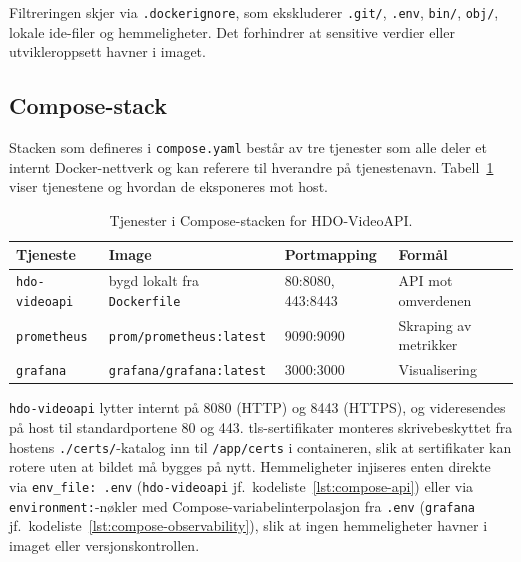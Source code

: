 Filtreringen skjer via \texttt{.dockerignore}, som ekskluderer \texttt{.git/}, \texttt{.env}, \texttt{bin/}, \texttt{obj/}, lokale \gls{ide}-filer og hemmeligheter. Det forhindrer at sensitive verdier eller utvikleroppsett havner i imaget.

\subsection{Compose-stack}
\label{subsec:docker-compose}

Stacken som defineres i \texttt{compose.yaml} består av tre tjenester som alle deler et internt Docker-nettverk og kan referere til hverandre på tjenestenavn. Tabell~\ref{tab:compose-services} viser tjenestene og hvordan de eksponeres mot host.

\begin{table}[H]
\centering
\caption{Tjenester i Compose-stacken for HDO-VideoAPI.}
\label{tab:compose-services}
\begin{tabular}{l l l l}
\toprule
\textbf{Tjeneste} & \textbf{Image} & \textbf{Portmapping} & \textbf{Formål} \\
\midrule
\texttt{hdo-videoapi} & bygd lokalt fra \texttt{Dockerfile} & 80:8080, 443:8443 & API mot omverdenen \\
\texttt{prometheus}   & \texttt{prom/prometheus:latest}     & 9090:9090         & Skraping av metrikker \\
\texttt{grafana}      & \texttt{grafana/grafana:latest}     & 3000:3000         & Visualisering \\
\bottomrule
\end{tabular}
\end{table}


\texttt{hdo-videoapi} lytter internt på 8080 (HTTP) og 8443 (HTTPS), og videresendes på host til standardportene 80 og 443. \gls{tls}-sertifikater monteres skrivebeskyttet fra hostens \texttt{./certs/}-katalog inn til \texttt{/app/certs} i containeren, slik at sertifikater kan rotere uten at bildet må bygges på nytt. Hemmeligheter injiseres enten direkte via \texttt{env\_file: .env} (\texttt{hdo-videoapi} jf.\ kodeliste~\ref{lst:compose-api}) eller via \texttt{environment:}-nøkler med Compose-variabelinterpolasjon fra \texttt{.env} (\texttt{grafana} jf.\ kodeliste~\ref{lst:compose-observability}), slik at ingen hemmeligheter havner i imaget eller versjonskontrollen.

